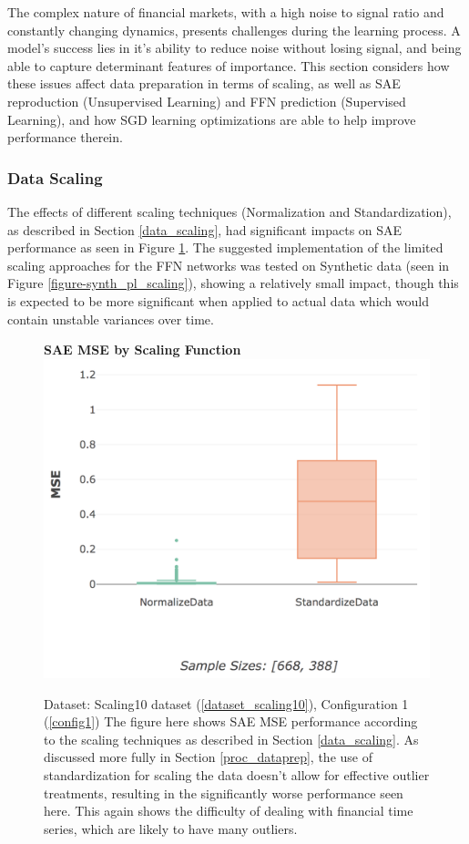 \documentclass[a4paper,11pt,oneside]{article}
\theoremstyle{plain}
\theoremstyle{definition}
\begin{document}
	The complex nature of financial markets, with a high noise to signal ratio and constantly changing dynamics, presents challenges during the learning process. A model's success lies in it's ability to reduce noise without losing signal, and being able to capture determinant features of importance. This section considers how these issues affect data preparation in terms of scaling, as well as SAE reproduction (Unsupervised Learning) and FFN prediction (Supervised Learning), and how SGD learning optimizations are able to help improve performance therein.
	
	\subsubsection{Data Scaling}
	
	The effects of different scaling techniques (Normalization and Standardization), as described in Section \ref{data_scaling}, had significant impacts on SAE performance as seen in Figure \ref{figure-actual_mse_scaling}. The suggested implementation of the limited scaling approaches for the FFN networks was tested on Synthetic data (seen in Figure \ref{figure-synth_pl_scaling}), showing a relatively small impact, though this is expected to be more significant when applied to actual data which would contain unstable variances over time.
		
	\begin{figure}[H]
		\centering 
		\textbf{SAE MSE by Scaling Function}
		\includegraphics[scale=0.4]{images/results/complexity/mse_scaling.png}
		\caption[SAE MSE by Scaling Function]
		{Dataset: Scaling10 dataset (\ref{dataset_scaling10}), Configuration 1 (\ref{config1})
			\newline The figure here shows SAE MSE performance according to the scaling techniques as described in Section \ref{data_scaling}. As discussed more fully in Section \ref{proc_dataprep}, the use of standardization for scaling the data doesn't allow for effective outlier treatments, resulting in the significantly worse performance seen here. This again shows the difficulty of dealing with financial time series, which are likely to have many outliers.}
		\label{figure-actual_mse_scaling}
	\end{figure}
\end{document}
